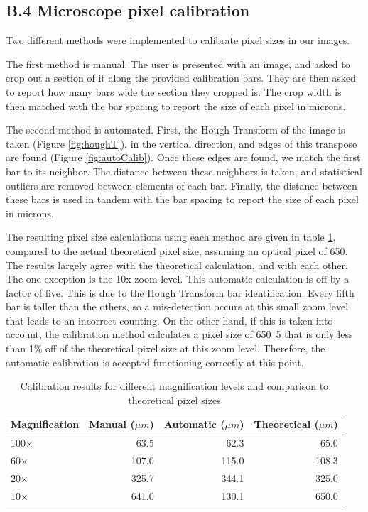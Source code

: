 \documentclass{article}
\begin{document}
\subsection*{B.4 Microscope pixel calibration}
 
Two different methods were implemented to calibrate pixel sizes in our images.

The first method is manual. The user is presented with an image, and asked to crop out a section of it along the provided calibration bars. They are then asked to report how many bars wide the section they cropped is. The crop width is then matched with the bar spacing to report the size of each pixel in microns.

The second method is automated. First, the Hough Transform of the image is taken (Figure \ref{fig:houghT}), in the vertical direction, and edges of this transpose are found (Figure \ref{fig:autoCalib}). Once these edges are found, we match the first bar to its neighbor. The distance between these neighbors is taken, and statistical outliers are removed between elements of each bar. Finally, the distance between these bars is used in tandem with the bar spacing to report the size of each pixel in microns. 

The resulting pixel size calculations using each method are given in table \ref{tab:calib}, compared to the actual theoretical pixel size, assuming an optical pixel of \unit{650}{\nano\meter}. The results largely agree with the theoretical calculation, and with each other. The one exception is the 10x zoom level. This automatic calculation is off by a factor of five. This is due to the Hough Transform bar identification. Every fifth bar is taller than the others, so a mis-detection occurs at this small zoom level that leads to an incorrect counting. On the other hand, if this is taken into account, the calibration method calculates a pixel size of \unit{650.5}{\nano\meter} that is only less than 1\% off of the theoretical pixel size at this zoom level. Therefore, the automatic calibration is accepted functioning correctly at this point.

\begin{table}
\caption{Calibration results for different magnification levels and comparison to theoretical pixel sizes}
\label{tab:calib}
\begin{center}
\begin{tabular}{l || r | r || r}
     Magnification & Manual ($\mu m$) & Automatic ($\mu m$) & Theoretical ($\mu m$) \\
     \hline\hline
     100$\times$                & 63.5            & 62.3               & 65.0 \\ \hline
     60$\times$                 & 107.0           & 115.0              & 108.3 \\ \hline
     20$\times$                 & 325.7           & 344.1              & 325.0 \\ \hline
     10$\times$                 & 641.0           & 130.1              & 650.0 
\end{tabular}
\end{center}
\end{table}
\end{document}
